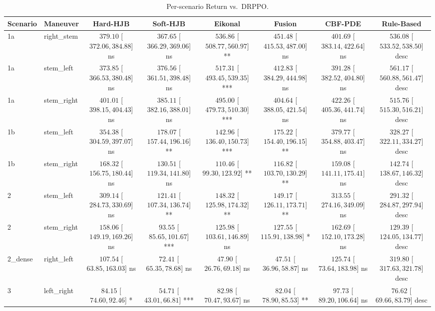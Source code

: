 \begin{table}[ht]
\centering
\caption{Per-scenario Return vs.\ DRPPO.}
\label{tab:per_scenario_mean_return}
\begin{tabular}{llcccccc}
\toprule
Scenario & Maneuver & Hard-HJB & Soft-HJB & Eikonal & Fusion & CBF-PDE & Rule-Based \\
\midrule
1a & right_stem & $379.10$ [$372.06, 384.88$] ns & $367.65$ [$366.29, 369.06$] ns & $536.86$ [$508.77, 560.97$] ** & $451.48$ [$415.53, 487.00$] ns & $401.69$ [$383.14, 422.64$] ns & $536.08$ [$533.52, 538.50$] desc \\
1a & stem_left & $373.85$ [$366.53, 380.48$] ns & $376.56$ [$361.51, 398.48$] ns & $517.31$ [$493.45, 539.35$] *** & $412.83$ [$384.29, 444.98$] ns & $391.28$ [$382.52, 404.80$] ns & $561.17$ [$560.88, 561.47$] desc \\
1a & stem_right & $401.01$ [$398.15, 404.43$] ns & $385.11$ [$382.16, 388.01$] ns & $495.00$ [$479.73, 510.30$] *** & $404.64$ [$388.05, 421.54$] ns & $422.26$ [$405.36, 441.74$] ns & $515.76$ [$515.30, 516.21$] desc \\
1b & stem_left & $354.38$ [$304.59, 397.07$] ns & $178.07$ [$157.44, 196.16$] ** & $142.96$ [$136.40, 150.73$] *** & $175.22$ [$154.40, 196.15$] ** & $379.77$ [$354.88, 403.47$] ns & $328.27$ [$322.11, 334.27$] desc \\
1b & stem_right & $168.32$ [$156.75, 180.44$] ns & $130.51$ [$119.34, 141.80$] ns & $110.46$ [$99.30, 123.92$] ** & $116.82$ [$103.70, 130.29$] ** & $159.08$ [$141.11, 175.41$] ns & $142.74$ [$138.67, 146.32$] desc \\
2 & stem_left & $309.14$ [$284.73, 330.69$] ns & $121.41$ [$107.34, 136.74$] ** & $148.32$ [$125.98, 174.32$] ** & $149.17$ [$126.11, 173.71$] ** & $313.55$ [$274.16, 349.09$] ns & $291.32$ [$284.87, 297.94$] desc \\
2 & stem_right & $158.06$ [$149.19, 169.26$] ns & $93.55$ [$85.65, 101.67$] *** & $125.98$ [$103.61, 146.89$] ns & $127.55$ [$115.91, 138.98$] * & $162.69$ [$152.10, 173.28$] ns & $129.39$ [$124.05, 134.77$] desc \\
2_dense & right_left & $107.54$ [$63.85, 163.03$] ns & $72.41$ [$65.35, 78.68$] ns & $47.90$ [$26.76, 69.18$] ns & $47.51$ [$36.96, 58.87$] ns & $125.74$ [$73.64, 183.98$] ns & $319.80$ [$317.63, 321.78$] desc \\
3 & left_right & $84.15$ [$74.60, 92.46$] * & $54.71$ [$43.01, 66.81$] *** & $82.98$ [$70.47, 93.67$] ns & $82.04$ [$78.90, 85.53$] ** & $97.73$ [$89.20, 106.64$] ns & $76.62$ [$69.66, 83.79$] desc \\

\end{tabular}
\end{table}
